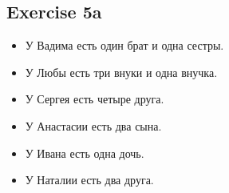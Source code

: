 \documentclass[a4paper, 11pt]{article}
\begin{document}
    \subsection{Exercise 5a}
    \begin{itemize}
      \item У Вадима есть один брат и одна сестры.
      \item У Любы есть три внуки и одна внучка.
      \item У Сергея есть четыре друга.
      \item У Анастасии есть два сына. 
      \item У Ивана есть одна дочь.
      \item У Наталии есть два друга.
    \end{itemize}
\end{document}
